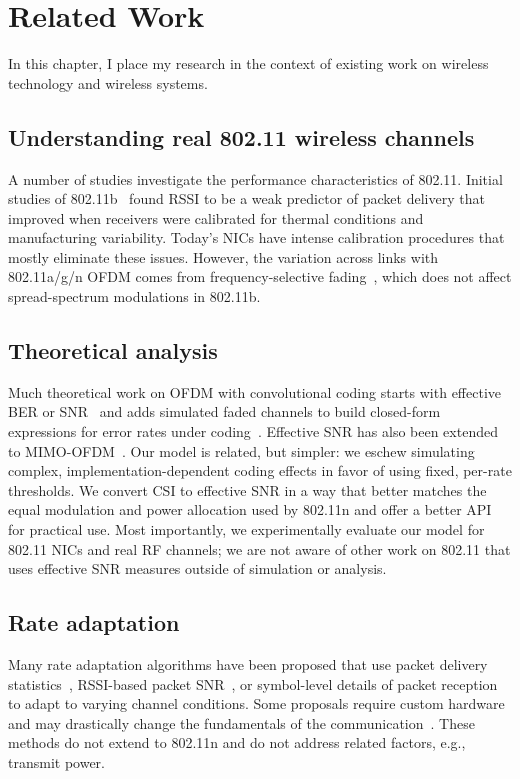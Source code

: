 \ifx\mainfile\undefined

\setcounter{chapter}{8} %
\fi

\cleardoublepage
\chapter{Related Work}
\label{chap:related}

In this chapter, I place my research in the context of existing work on wireless technology and wireless systems.

\section{Understanding real 802.11 wireless channels}
A number of studies investigate the performance characteristics of 802.11. Initial studies of 802.11b~\cite{Aguayo_Roofnet,Reis_interference} found RSSI to be a weak predictor of packet delivery that improved when receivers were calibrated for thermal conditions and manufacturing variability. Today's NICs have intense calibration procedures that mostly eliminate these issues. However, the variation across links with 802.11a/g/n OFDM comes from frequency-selective fading~\cite{Lampe_adaptation, Tse}, which does not affect spread-spectrum modulations in 802.11b.

\section{Theoretical analysis}
Much theoretical work on OFDM with convolutional coding starts with effective BER or SNR~\cite{Nanda_EffectiveSNR} and adds simulated faded channels to build closed-form expressions for error rates under coding~\cite{Tobagi_ofdm,Nortel_3g,Tralli_convolutional}. Effective SNR has also been extended to MIMO-OFDM~\cite{Liu_EESM,Martorell_11n}. Our model is related, but simpler: we eschew simulating complex, implementation-dependent coding effects in favor of using fixed, per-rate thresholds. We convert CSI to effective SNR in a way that better matches the equal modulation and power allocation used by 802.11n and offer a better API for practical use. Most importantly, we experimentally evaluate our model for 802.11 NICs and real RF channels; we are not aware of other work on 802.11 that uses effective SNR measures outside of simulation or analysis.

\section{Rate adaptation}
Many rate adaptation algorithms have been proposed that use packet delivery statistics~\cite{Bicket_SampleRate,Wong_RRAA}, RSSI-based packet SNR~\cite{Camp_rateadapt,Judd_CHARM}, or symbol-level details of packet reception~\cite{Sen_AccuRate,Vutukuru_SoftRate} to adapt to varying channel conditions. Some proposals require custom hardware~\cite{Camp_rateadapt} and may drastically change the fundamentals of the communication~\cite{Rahul_FARA}. These methods do not extend to 802.11n and do not address related factors, e.g., transmit power.

